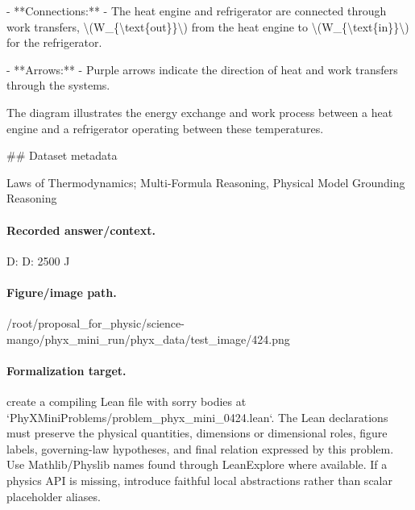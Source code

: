 - **Connections:**
  - The heat engine and refrigerator are connected through work transfers, \textbackslash{}(W\_\{\textbackslash{}text\{out\}\}\textbackslash{}) from the heat engine to \textbackslash{}(W\_\{\textbackslash{}text\{in\}\}\textbackslash{}) for the refrigerator.

- **Arrows:**
  - Purple arrows indicate the direction of heat and work transfers through the systems.

The diagram illustrates the energy exchange and work process between a heat engine and a refrigerator operating between these temperatures.

\#\# Dataset metadata

Laws of Thermodynamics; Multi-Formula Reasoning, Physical Model Grounding Reasoning

\paragraph{Recorded answer/context.}
D: D: 2500 J

\paragraph{Figure/image path.}
/root/proposal\_for\_physic/science-mango/phyx\_mini\_run/phyx\_data/test\_image/424.png

\paragraph{Formalization target.}
create a compiling Lean file with sorry bodies at `PhyXMiniProblems/problem\_phyx\_mini\_0424.lean`. The Lean declarations must preserve the physical quantities, dimensions or dimensional roles, figure labels, governing-law hypotheses, and final relation expressed by this problem.
Use Mathlib/Physlib names found through LeanExplore where available. If a physics API is missing, introduce faithful local abstractions rather than scalar placeholder aliases.


